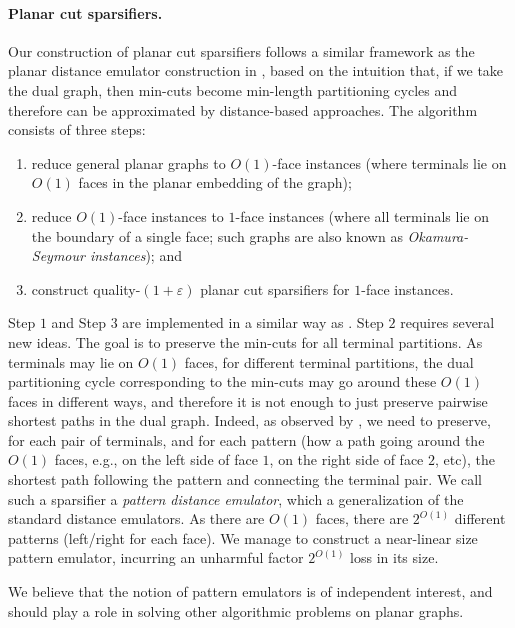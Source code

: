 \documentclass[11pt]{article}
\theoremstyle{definition}
\newcommand{\eps}{{\varepsilon}}
\begin{document}
\paragraph{Planar cut sparsifiers.}
Our construction of planar cut sparsifiers follows a similar framework as the planar distance emulator construction in \cite{chang2022near}, based on the intuition that, if we take the dual graph, then min-cuts become min-length partitioning cycles and therefore can be approximated by distance-based approaches. The algorithm consists of three steps: 
\begin{enumerate}
\item reduce general planar graphs to $O(1)$-face instances (where terminals lie on $O(1)$ faces in the planar embedding of the graph);
\item reduce $O(1)$-face instances to $1$-face instances (where all terminals lie on the boundary of a single face; such graphs are also known as \emph{Okamura-Seymour instances}); and
\item construct quality-$(1+\eps)$ planar cut sparsifiers for $1$-face instances.
\end{enumerate}
Step $1$ and Step $3$ are implemented in a similar way as \cite{chang2022near}. Step $2$ requires several new ideas. The goal is to preserve the min-cuts for all terminal partitions. As terminals may lie on $O(1)$ faces, for different terminal partitions, the dual partitioning cycle corresponding to the min-cuts may go around these $O(1)$ faces in different ways, and therefore it is not enough to just preserve pairwise shortest paths in the dual graph. Indeed, as observed by \cite{krauthgamer2017refined}, we need to preserve, for each pair of terminals, and for each pattern (how a path going around the $O(1)$ faces, e.g., on the left side of face $1$, on the right side of face $2$, etc), the shortest path following the pattern and connecting the terminal pair. We call such a sparsifier a \emph{pattern distance emulator}, which a generalization of the standard distance emulators.
As there are $O(1)$ faces, there are $2^{O(1)}$ different patterns (left/right for each face). We manage to construct a near-linear size pattern emulator, incurring an unharmful factor $2^{O(1)}$ loss in its size. 

We believe that the notion of pattern emulators is of independent interest, and should play a role in solving other algorithmic problems on planar graphs.
\end{document}
